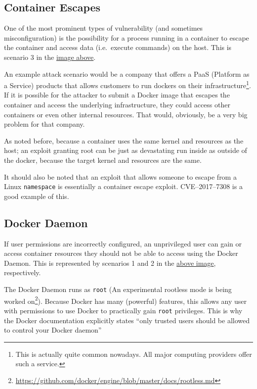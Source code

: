 \subsection{Container Escapes}
One of the most prominent types of vulnerability (and sometimes misconfiguration) is the possibility for a process running in a container to escape the container and access data (i.e.\ execute commands) on the host. This is scenario 3 in the \href{fig:attacksurfaces}{image above}.

\hfill

An example attack scenario would be a company that offers a PaaS (Platform as a Service) products that allows customers to run dockers on their infrastructure\footnote{This is actually quite common nowadays. All major computing providers offer such a service.}. If it is possible for the attacker to submit a Docker image that escapes the container and access the underlying infrastructure, they could access other containers or even other internal resources. That would, obviously, be a very big problem for that company.

\hfill

As noted before, because a container uses the same kernel and resources as the host; an exploit granting root can be just as devastating run inside as outside of the docker, because the target kernel and resources are the same.

It should also be noted that an exploit that allows someone to escape from a Linux \lstinline{namespace} is essentially a container escape exploit. CVE--2017--7308\cite{CVE-2017-7308} is a good example of this.

\subsection{Docker Daemon}
If user permissions are incorrectly configured, an unprivileged user can gain or access container resources they should not be able to access using the Docker Daemon. This is represented by scenarios 1 and 2 in the \href{fig:attacksurfaces}{above image}, respectively.

\hfill

The Docker Daemon runs as \lstinline{root} (An experimental rootless mode is being worked on\footnote{\url{https://github.com/docker/engine/blob/master/docs/rootless.md}}). Because Docker has many (powerful) features, this allows any user with permissions to use Docker to practically gain \lstinline{root} privileges. This is why the Docker documentation explicitly states ``only trusted users should be allowed to control your Docker daemon''\cite{dockerdaemonattacksurface}

